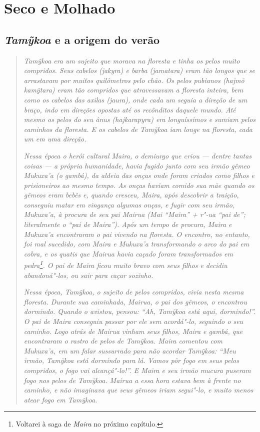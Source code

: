 \section{Seco e Molhado}\label{seco-e-molhado}

\subsection{\emph{Tamỹkoa} e a origem do verão}

\begin{quote}


\emph{\emph{Tamỹkoa} era um sujeito que morava na floresta e tinha os pelos
muito compridos. Seus cabelos (\emph{jakyra}) e barba (\emph{jamatara})
eram tão longos que se arrastavam por muitos quilômetros pelo chão. Os
pelos pubianos (\emph{hajmõ} \emph{kamỹtara}) eram tão compridos que
atravessavam a floresta inteira, bem como os cabelos das axilas
(\emph{jaura}), onde cada um seguia a direção de um braço, indo em
direções opostas até os recônditos daquele mundo. Até mesmo os pelos do
seu ânus (\emph{hajkarapyra}) era longuíssimos e sumiam pelos caminhos
da floresta. E os cabelos de \emph{Tamỹkoa} iam longe na floresta, cada
um em uma direção.}

\emph{Nessa época o herói cultural \emph{Maira}, o demiurgo que criou --- dentre
tantas coisas --- a própria humanidade, havia fugido junto com seu irmão
gêmeo \emph{Mukuxa'a} (o gambá), da aldeia das onças onde foram criados
como filhos e prisioneiros ao mesmo tempo. As onças haviam comido sua
mãe quando os gêmeos eram bebês e, quando cresceu, \emph{Maira}, após
descobrir a traição, conseguiu matar em vingança algumas onças, e fugir
com seu irmão, \emph{Mukuxa'a}, à procura de seu pai \emph{Mairua}
(\emph{Mai} ``\emph{Maira}'' + \emph{r"-ua} ``pai de''; literalmente o
``pai de \emph{Maira}''). Após um tempo de procura, \emph{Maira} e
\emph{Mukuxa'a} encontraram o pai vivendo na floresta. O encontro, no
entanto, foi mal sucedido, com Maira e \emph{Mukuxa'a} transformando o
arco do pai em cobra, e os quatis que \emph{Mairua} havia caçado foram
transformados em pedra\footnote{Voltarei à saga de \emph{Maira} no
  próximo capítulo.}. O pai de \emph{Maira} ficou muito bravo com seus
filhos e decidiu abandoná"-los, ou sair para caçar sozinho.}

\emph{Nessa época, \emph{Tamỹkoa}, o sujeito de pelos compridos, vivia nesta
mesma floresta. Durante sua caminhada, \emph{Mairua}, o pai dos gêmeos,
o encontrou dormindo. Quando o avistou, pensou: ``Ah, \emph{Tamỹkoa}
está aqui, dormindo!''. O pai de \emph{Maira} conseguiu passar por ele
sem acordá"-lo, seguindo o seu caminho. Logo atrás de \emph{Mairua}
vinham seus filhos, \emph{Maira} e gambá, que encontraram o rastro de
pelos de \emph{Tamỹkoa}. \emph{Maira} comentou com \emph{Mukuxa'a}, em
um falar sussurrado para não acordar \emph{Tamỹkoa}: ``Meu irmão,
\emph{Tamỹkoa} está dormindo para lá. Vamos pôr fogo em seus pelos
compridos, o fogo vai alcançá"-lo!''. E \emph{Maira} e seu irmão mucura
puseram fogo nos pelos de \emph{Tamỹkoa}. \emph{Mairua} a essa hora
estava bem à frente no caminho, e não imaginava que seus gêmeos iriam
segui"-lo, e muito menos atear fogo em \emph{Tamỹkoa}.}


\end{quote}
